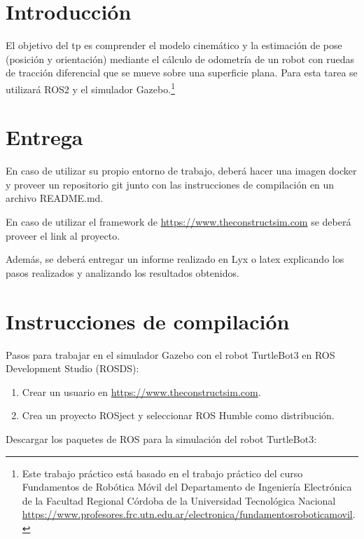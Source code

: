 \documentclass[tp]{lcc}
\begin{document}
\maketitle


\section{Introducción}

El objetivo del tp es comprender el modelo cinemático y la estimación de pose (posición y orientación) mediante el cálculo de odometría de un robot con ruedas de tracción diferencial que se mueve sobre una superficie plana. Para esta tarea se utilizará ROS2 y el simulador Gazebo.\footnote{Este trabajo práctico está basado en el trabajo práctico del curso Fundamentos de Robótica Móvil del Departamento de Ingeniería Electrónica de la Facultad Regional Córdoba de la Universidad Tecnológica Nacional \url{https://www.profesores.frc.utn.edu.ar/electronica/fundamentosroboticamovil}.}


\section{Entrega}
En caso de utilizar su propio entorno de trabajo, deberá hacer una imagen docker y proveer un repositorio git junto con las instrucciones de compilación en un archivo README.md.

En caso de utilizar el framework de \url{https://www.theconstructsim.com} se deberá proveer el link al proyecto.

Además, se deberá entregar un informe realizado en Lyx o latex explicando los pasos realizados y analizando los resultados obtenidos.

\section{Instrucciones de compilación}
Pasos para trabajar en el simulador Gazebo con el robot TurtleBot3 en ROS Development Studio (ROSDS):

\begin{enumerate}
	\item Crear un usuario en \url{https://www.theconstructsim.com}.
	\item Crea un proyecto ROSject y seleccionar ROS Humble como distribución.
\end{enumerate}

Descargar los paquetes de ROS para la simulación del robot TurtleBot3:
\end{document}
